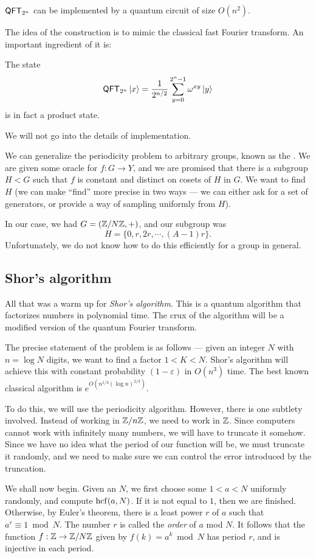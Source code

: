 \begin{fact}
  $\mathsf{QFT}_{2^n}$ can be implemented by a quantum circuit of size $O(n^2)$.
\end{fact}
The idea of the construction is to mimic the classical fast Fourier transform. An important ingredient of it is:
\begin{fact}
  The state
  \[
    \mathsf{QFT}_{2^n} \left\lvert x\right\rangle = \frac{1}{2^{n/2}} \sum_{y = 0}^{2^n - 1} \omega^{xy}\left\lvert y\right\rangle
  \]
  is in fact a product state.
\end{fact}
We will not go into the details of implementation.

We can generalize the periodicity problem to arbitrary groups, known as the . We are given some oracle for $f: G \to Y$, and we are promised that there is a subgroup $H < G$ such that $f$ is constant and distinct on cosets of $H$ in $G$. We want to find $H$ (we can make ``find'' more precise in two ways --- we can either ask for a set of generators, or provide a way of sampling uniformly from $H$).

In our case, we had $G = (\mathbb{Z}/N\mathbb{Z}, +)$, and our subgroup was
\[
  H = \{0, r, 2r, \cdots, (A - 1) r\}.
\]
Unfortunately, we do not know how to do this efficiently for a group in general.

\subsection{Shor's algorithm}
All that was a warm up for \emph{Shor's algorithm}. This is a quantum algorithm that factorizes numbers in polynomial time. The crux of the algorithm will be a modified version of the quantum Fourier transform.

The precise statement of the problem is as follows --- given an integer $N$ with $n = \log N$ digits, we want to find a factor $1 < K < N$. Shor's algorithm will achieve this with constant probability $(1 - \varepsilon)$ in $O(n^3)$ time. The best known classical algorithm is $e^{O(n^{1/3} (\log n)^{2/3})}$.

To do this, we will use the periodicity algorithm. However, there is one subtlety involved. Instead of working in $\mathbb{Z}/n\mathbb{Z}$, we need to work in $\mathbb{Z}$. Since computers cannot work with infinitely many numbers, we will have to truncate it somehow. Since we have no idea what the period of our function will be, we must truncate it randomly, and we need to make sure we can control the error introduced by the truncation.

We shall now begin. Given an $N$, we first choose some $1 < a < N$ uniformly randomly, and compute $\operatorname{hcf}(a, N)$. If it is not equal to $1$, then we are finished. Otherwise, by Euler's theorem, there is a least power $r$ of $a$ such that $a^r \equiv 1 \bmod N$. The number $r$ is called the \emph{order} of $a$ mod $N$. It follows that the function $f: \mathbb{Z} \to \mathbb{Z}/N\mathbb{Z}$ given by $f(k) = a^k \bmod N$ has period $r$, and is injective in each period.

